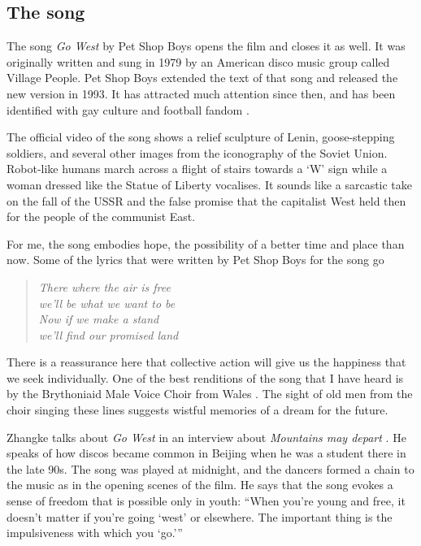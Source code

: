 \documentclass{article}
\begin{document}
\subsection{The song}
\label{sec:njpsvlf6}

The song \emph{Go West} by Pet Shop Boys opens the film and closes it
as well.  It was originally written and sung in 1979 by an American
disco music group called Village People.  Pet Shop Boys extended the
text of that song and released the new version in 1993.  It has
attracted much attention since then, and has been identified with gay
culture and football fandom \parencite{bib:3hf0kuo0}.

The official video of the song \parencite{bib:4dsv5d40} shows a relief
sculpture of Lenin, goose-stepping soldiers, and several other images
from the iconography of the Soviet Union.  Robot-like humans march
across a flight of stairs towards a `W' sign while a woman dressed
like the Statue of Liberty vocalises.  It sounds like a sarcastic take
on the fall of the USSR and the false promise that the capitalist West
held then for the people of the communist East.

For me, the song embodies hope, the possibility of a better time and
place than now.  Some of the lyrics that were written by Pet Shop Boys
for the song go
\begin{verse} \itshape
  There where the air is free \\
  we'll be what we want to be \\
  Now if we make a stand \\
  we'll find our promised land
\end{verse}
There is a reassurance here that collective action will give us the
happiness that we seek individually.  One of the best renditions of
the song that I have heard is by the Brythoniaid Male Voice Choir from
Wales \parencite{bib:4lizl8c7}.  The sight of old men from the choir
singing these lines \parencite{bib:n7kfye4j} suggests wistful memories
of a dream for the future.

Zhangke talks about \emph{Go West} in an interview about
\emph{Mountains may depart} \parencite{bib:zt0dmft0}.  He speaks of
how discos became common in Beijing when he was a student there in the
late 90s.  The song was played at midnight, and the dancers formed a
chain to the music as in the opening scenes of the film.  He says that
the song evokes a sense of freedom that is possible only in youth:
``When you're young and free, it doesn’t matter if you're going `west'
or elsewhere.  The important thing is the impulsiveness with which you
{`go.'}''
\end{document}
